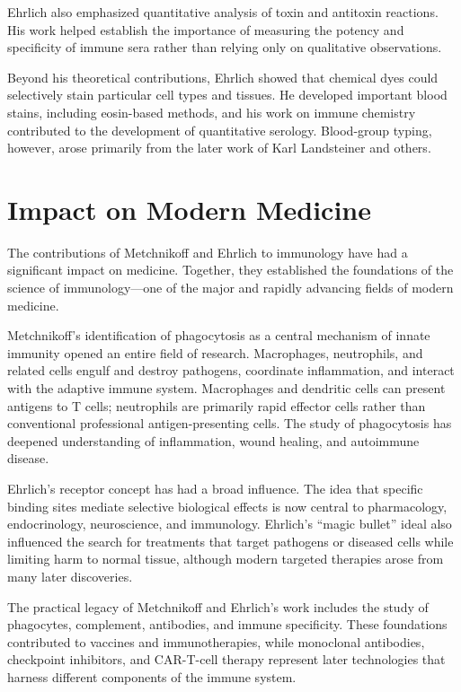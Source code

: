 Ehrlich also emphasized quantitative analysis of toxin and antitoxin reactions. His work helped establish the importance of measuring the potency and specificity of immune sera rather than relying only on qualitative observations.

Beyond his theoretical contributions, Ehrlich showed that chemical dyes could selectively stain particular cell types and tissues. He developed important blood stains, including eosin-based methods, and his work on immune chemistry contributed to the development of quantitative serology. Blood-group typing, however, arose primarily from the later work of Karl Landsteiner and others.

\section{Impact on Modern Medicine}

The contributions of Metchnikoff and Ehrlich to immunology have had a significant impact on medicine. Together, they established the foundations of the science of immunology---one of the major and rapidly advancing fields of modern medicine.

Metchnikoff's identification of phagocytosis as a central mechanism of innate immunity opened an entire field of research. Macrophages, neutrophils, and related cells engulf and destroy pathogens, coordinate inflammation, and interact with the adaptive immune system. Macrophages and dendritic cells can present antigens to T cells; neutrophils are primarily rapid effector cells rather than conventional professional antigen-presenting cells. The study of phagocytosis has deepened understanding of inflammation, wound healing, and autoimmune disease.

Ehrlich's receptor concept has had a broad influence. The idea that specific binding sites mediate selective biological effects is now central to pharmacology, endocrinology, neuroscience, and immunology. Ehrlich's ``magic bullet'' ideal also influenced the search for treatments that target pathogens or diseased cells while limiting harm to normal tissue, although modern targeted therapies arose from many later discoveries.

The practical legacy of Metchnikoff and Ehrlich's work includes the study of phagocytes, complement, antibodies, and immune specificity. These foundations contributed to vaccines and immunotherapies, while monoclonal antibodies, checkpoint inhibitors, and CAR-T-cell therapy represent later technologies that harness different components of the immune system.

